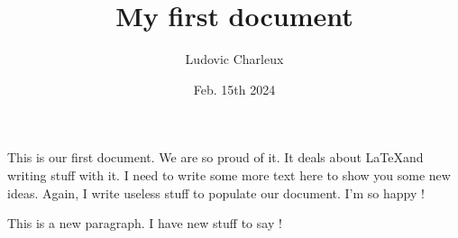 \documentclass[10pt,a4paper,twoside]{article}
\author{Ludovic Charleux}
\title{My first document}
\date{Feb. 15th 2024}
\begin{document}
\maketitle

This is our first document. 
We are so proud of it. 
It deals about \LaTeX and writing stuff with it.
I need to write some more text here to show you some new ideas.
Again, I write useless stuff to populate our document.
I'm so happy !

This is a new paragraph. 
I have new stuff to say !
\end{document}
